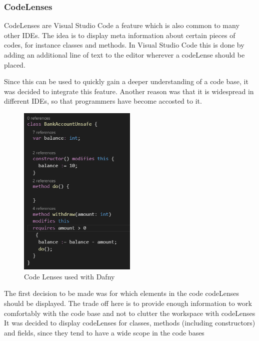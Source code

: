 \subsubsection{CodeLenses} \label{codelenses}
CodeLenses are Visual Studio Code a feature which is also common to many other IDEs. The idea is to display meta information about certain pieces of codes, for instance classes and methods. In Visual Studio Code this is done  by adding an additional line of text to the editor wherever a codeLense should  be placed. \newline

Since this can be used to quickly gain a deeper understanding of a code base, it was decided to integrate this feature. Another reason was that it is widespread in different IDEs, so that programmers have become accosted to it. \newline

\begin{figure}[H]
	\centering
	\includegraphics[width=0.5\textwidth]{img/codelensesClosed}
	\caption{Code Lenses used with Dafny}
	\label{fig:codelensesclosed}
\end{figure}

The first decision to be made was for which elements in the code codeLenses should be displayed. The trade off here is to  provide enough information to work comfortably with the code base and not to clutter the workspace with codeLenses It was decided to display codeLenses for classes, methods (including constructors) and fields, since they tend to have a wide scope in the code bases \newline

